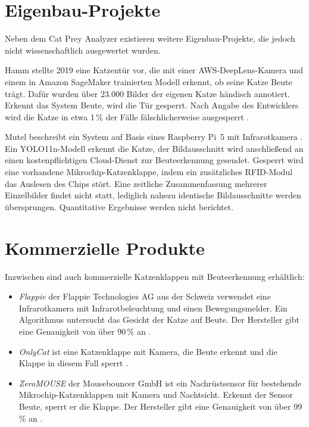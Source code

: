 \section{Eigenbau-Projekte}
\label{sec:rw_diy}
Neben dem Cat Prey Analyzer existieren weitere Eigenbau-Projekte, die jedoch nicht wissenschaftlich ausgewertet wurden.

Hamm stellte 2019 eine Katzentür vor, die mit einer AWS-DeepLens-Kamera und einem in Amazon SageMaker trainierten Modell erkennt, ob seine Katze Beute trägt. Dafür wurden über 23.000 Bilder der eigenen Katze händisch annotiert. Erkennt das System Beute, wird die Tür gesperrt. Nach Angabe des Entwicklers wird die Katze in etwa 1\,\% der Fälle fälschlicherweise ausgesperrt \cite{hamm2019critterblock}.

Mutel beschreibt ein System auf Basis eines Raspberry Pi~5 mit Infrarotkamera \cite{mutel2025catflap}. Ein YOLO11n-Modell erkennt die Katze, der Bildausschnitt wird anschließend an einen kostenpflichtigen Cloud-Dienst zur Beuteerkennung gesendet. Gesperrt wird eine vorhandene Mikrochip-Katzenklappe, indem ein zusätzliches RFID-Modul das Auslesen des Chips stört. Eine zeitliche Zusammenfassung mehrerer Einzelbilder findet nicht statt, lediglich nahezu identische Bildausschnitte werden übersprungen. Quantitative Ergebnisse werden nicht berichtet.

\section{Kommerzielle Produkte}
\label{sec:rw_produkte}
Inzwischen sind auch kommerzielle Katzenklappen mit Beuteerkennung erhältlich:

\begin{itemize}
	\item \emph{Flappie} der Flappie Technologies AG aus der Schweiz verwendet eine Infrarotkamera mit Infrarotbeleuchtung und einen Bewegungsmelder. Ein Algorithmus untersucht das Gesicht der Katze auf Beute. Der Hersteller gibt eine Genauigkeit von über 90\,\% an \cite{flappie2024}.
	\item \emph{OnlyCat} ist eine Katzenklappe mit Kamera, die Beute erkennt und die Klappe in diesem Fall sperrt \cite{onlycat2026}.
	\item \emph{ZeroMOUSE} der Mousebouncer GmbH ist ein Nachrüstsensor für bestehende Mikrochip-Katzenklappen mit Kamera und Nachtsicht. Erkennt der Sensor Beute, sperrt er die Klappe. Der Hersteller gibt eine Genauigkeit von über 99\,\% an \cite{zeromouse2026}.
\end{itemize}

